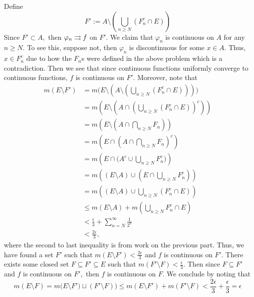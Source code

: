 \documentclass[11pt]{article}
\newcommand{\sm}{\setminus}
\begin{document}
\begin{enumerate}
\begin{solution}
        Define 
        \[F':= A \sm \left(\bigcup_{n\geq N}(F_n^c \cap E)\right)\] Since $F'\subset A,$ then $\varphi_n \overset{}{\rightrightarrows} f$ on $F'.$ We claim that $\varphi_n$ is continuous on $A$ for any $n\geq N.$ To see this, suppose not, then $\varphi_n$ is discontinuous for some $x\in A.$ Thus, $x\in F_n^c$ due to how the $F_n$s were defined in the above problem which is a contradiction. Then we see that since continuous functions uniformly converge to continuous functions, $f$ is continuous on $F'.$ Moreover, note that 
        \begin{align*}
            m(E\sm F') &= m\bigg(E \sm \left(A \sm \left(\bigcup_{n\geq N}(F_n^c \cap E)\right)\right)\bigg)\\
            &= m\left(E\sm \left(A \cap \left(\bigcup_{n\geq N}(F_n^c \cap E)\right)^c\right)\right)\\
            &= m\left(E \sm \left(A \cap \bigcap_{n\geq N}F_n\right)\right)\\
            &= m\left(E \cap \left(A \cap \bigcap_{n\geq N}F_n\right)^c\right)\\
            &= m\left(E \cap \bigg(A^c \cup \bigcup_{n\geq N} F_n^c\bigg)\right)\\
            &= m\left((E\sm A) \cup (E \cap \bigcup_{n\geq N}F_n ^c) \right)\\
            &= m\left((E\sm A) \cup \bigcup_{n\geq N}(F_n ^c \cap E)\right)\\
            &\leq m(E\sm A) + m(\bigcup_{n\geq N}F_n ^c \cap E)\\
            &< \frac{\epsilon}{3} + \sum_{n=N}^\infty \frac{1}{2^n}\\
            &< \frac{2\epsilon}{3},
        \end{align*}
    where the second to last inequality is from work on the previous part. Thus, we have found a set $F'$ such that $m(E\sm F') < \frac{2\epsilon}{3}$ and $f$ is continuous on $F'.$ There exists some closed set $F\subseteq F' \subseteq E$ such that $m(F' \sm F) < \frac{\epsilon}{3}.$ Then since $F \subseteq F'$ and $f$ is continuous on $F',$ then $f$ is continuous on $F.$ We conclude by noting that 
    \[m(E\sm F) = m\big(E\sm F') \sqcup (F'\sm F)\big) \leq m(E\sm F') + m(F'\sm F) < \frac{2\epsilon}{3} + \frac{\epsilon}{3}= \epsilon\]
    \end{solution}
\end{enumerate}


\newpage
\end{document}
